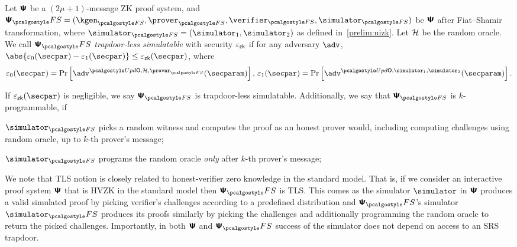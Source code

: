 \begin{definition}
  \label{def:tls}
  Let $\bm{\mathsf{\Psi}}$ be a $(2\mu + 1)$-message ZK proof system, and
  $\ps_\fs= (\kgen_{\fs}, \prover_{\fs}, \verifier_{\fs}, \simulator_{\fs})$ be $\bm{\mathsf{\Psi}}$ after Fiat--Shamir transformation, where $\simulator_{\fs} = (\simulator_1, \simulator_2)$ as defined in~\cref{prelim:nizk}. Let $\mathcal{H}$ be the random oracle. 
  We call $\psfs$ \emph{trapdoor-less simulatable} with security $\varepsilon_{\mathsf{zk}}$ if for any
  adversary $\adv$, $\abs{\eps_0(\secpar) - \eps_1(\secpar)} \leq \epszk(\secpar)$, where
  \begin{align*}
    \eps_0 (\secpar) = \Pr\left[ \adv^{\initU, \ro, \prover_{\fs}} (\secparam) \right],\,
    \eps_1 (\secpar)=  \Pr \left[\adv^{\initU, \simulator_1, \simulator_2} (\secparam) \right].
  \end{align*}
  
  If $\epszk(\secpar)$ is negligible, we say $\ps_{\fs}$ is trapdoor-less simulatable. Additionally, we say that $\ps_{\fs}$ is $k$-programmable, if 
	\begin{inparaenum}[(a)]
		\item $\simulator_{\fs}$ picks a random witness and computes the proof as an honest prover would, including computing challenges using random oracle, up to $k$-th prover's message;
		\item $\simulator_{\fs}$  programs the random oracle \emph{only} after $k$-th prover's message;
	\end{inparaenum}
  \end{definition}

  
\begin{remark}
  We note that TLS notion is closely related to honest-verifier zero knowledge in the
  standard model. That is, if we consider an interactive proof system $\bm{\mathsf{\Psi}}$
  that is HVZK in the standard model then $\proofsystem_\fs$ is TLS. This comes as the simulator $\simulator$ in
  $\bm{\mathsf{\Psi}}$ produces a valid simulated proof by picking verifier's challenges
  according to a predefined distribution and $\proofsystem_\fs$'s simulator
  $\simulator_\fs$ produces its proofs similarly by picking the challenges and
  additionally programming the random oracle to return the picked
  challenges. Importantly, in both $\bm{\mathsf{\Psi}}$ and $\proofsystem_\fs$ success of
  the simulator does not depend on access to an SRS trapdoor.
\end{remark}

